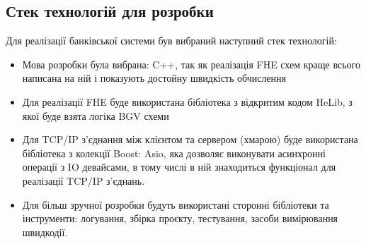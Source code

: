 \subsection{Стек технологій для розробки}
Для реалізації банківської системи був вибраний наступний стек технологій:
\begin{itemize}

    \item{Мова розробки була вибрана: C++, так як реалізація FHE схем краще всього написана
на ній і показують достойну швидкість обчислення}
    \item{Для реалізації FHE буде використана бібліотека з відкритим кодом HeLib, з
якої буде взята логіка BGV схеми}
    \item{Для TCP/IP з'єднання між клієнтом та сервером (хмарою) буде використана бібліотека
з колекції Boost: Asio, яка дозволяє виконувати асинхронні операції з IO девайсами, в тому
числі в ній знаходиться функціонал для реалізації TCP/IP з'єднань.}
    \item{Для більш зручної розробки будуть використані сторонні бібліотеки та інструменти:
логування, збірка проєкту, тестування, засоби вимірювання швидкодії.}
\end{itemize}


